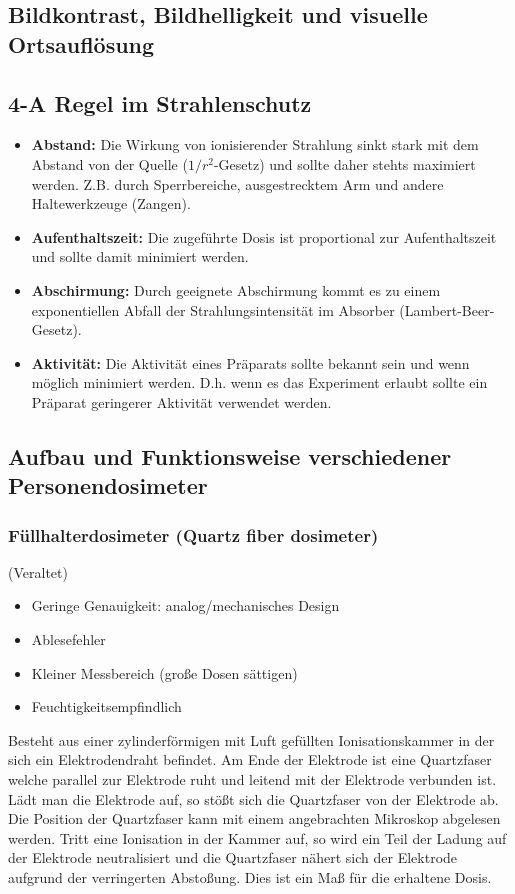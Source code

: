 \documentclass[11pt, a4paper]{article}
\numberwithin{equation}{section}
\begin{document}
\subsection{Bildkontrast, Bildhelligkeit und visuelle Ortsauflösung}


\subsection{4-A Regel im Strahlenschutz}
\begin{itemize}
	\item \textbf{Abstand:}
	Die Wirkung von ionisierender Strahlung sinkt stark mit dem Abstand von der Quelle ($1/r^2$-Gesetz) und sollte daher stehts maximiert werden.
	Z.B. durch Sperrbereiche, ausgestrecktem Arm und andere Haltewerkzeuge (Zangen).
	
	
	\item \textbf{Aufenthaltszeit:}
	Die zugeführte Dosis ist proportional zur Aufenthaltszeit und sollte damit minimiert werden.
	
	
	\item \textbf{Abschirmung:}
	Durch geeignete Abschirmung kommt es zu einem exponentiellen Abfall der Strahlungsintensität im Absorber (Lambert-Beer-Gesetz).
		
	
	\item \textbf{Aktivität:}
	Die Aktivität eines Präparats sollte bekannt sein und wenn möglich minimiert werden.
	D.h. wenn es das Experiment erlaubt sollte ein Präparat geringerer Aktivität verwendet werden.
	
	
\end{itemize}


\subsection{Aufbau und Funktionsweise verschiedener Personendosimeter}

\subsubsection{Füllhalterdosimeter (Quartz fiber dosimeter)}
(Veraltet)
\begin{itemize}
	\item Geringe Genauigkeit: analog/mechanisches Design
	\item Ablesefehler
	\item Kleiner Messbereich (große Dosen sättigen)
	\item Feuchtigkeitsempfindlich
\end{itemize}
Besteht aus einer zylinderförmigen mit Luft gefüllten Ionisationskammer in der sich ein Elektrodendraht befindet.
Am Ende der Elektrode ist eine Quartzfaser welche parallel zur Elektrode ruht und leitend mit der Elektrode verbunden ist.
Lädt man die Elektrode auf, so stößt sich die Quartzfaser von der Elektrode ab.
Die Position der Quartzfaser kann mit einem angebrachten Mikroskop abgelesen werden.
Tritt eine Ionisation in der Kammer auf, so wird ein Teil der Ladung auf der Elektrode neutralisiert und die Quartzfaser nähert sich der Elektrode aufgrund der verringerten Abstoßung.
Dies ist ein Maß für die erhaltene Dosis.
\end{document}
